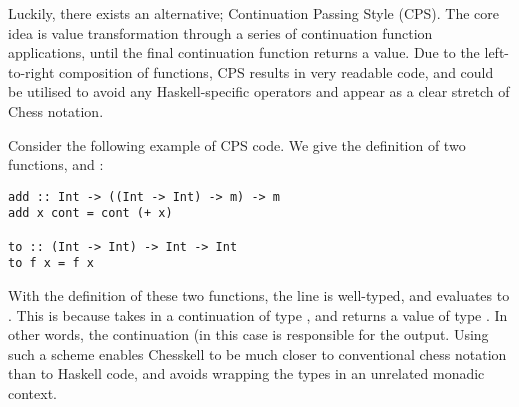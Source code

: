 Luckily, there exists an alternative; Continuation Passing Style (CPS). The core idea is value transformation through a series of continuation function applications, until the final continuation function returns a value. Due to the left-to-right composition of functions, CPS results in very readable code, and could be utilised to avoid any Haskell-specific operators and appear as a clear stretch of Chess notation.

Consider the following example of CPS code. We give the definition of two functions,  and :

\begin{lstlisting}
add :: Int -> ((Int -> Int) -> m) -> m
add x cont = cont (+ x)

to :: (Int -> Int) -> Int -> Int
to f x = f x
\end{lstlisting}

With the definition of these two functions, the line  is well-typed, and evaluates to . This is because  takes in a continuation of type , and returns a value of type . In other words, the continuation (in this case  is responsible for the output. Using such a scheme enables Chesskell to be much closer to conventional chess notation than to Haskell code, and avoids wrapping the types in an unrelated monadic context.